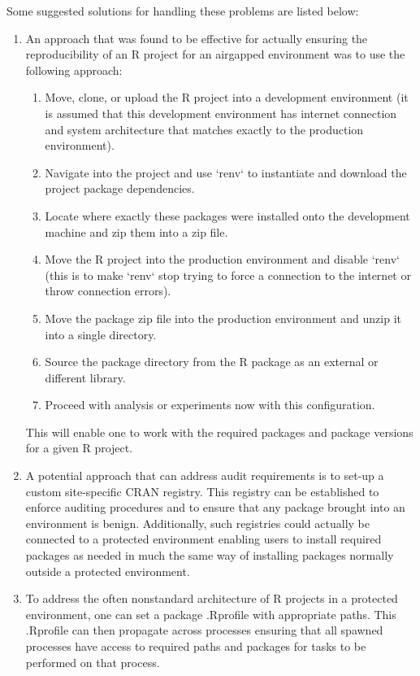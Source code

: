 \documentclass{amia}
\begin{document}
Some suggested solutions for handling these problems are listed below:

\begin{enumerate}
	\item An approach that was found to be effective for actually ensuring the reproducibility of an R project for an airgapped environment was to use the following approach:
	\begin{enumerate}
		\item Move, clone, or upload the R project into a development environment (it is assumed that this development environment has internet connection and system architecture that matches exactly to the production environment).
		\item Navigate into the project and use `renv` to instantiate and download the project package dependencies.
		\item Locate where exactly these packages were installed onto the development machine and zip them into a zip file.
		\item Move the R project into the production environment and disable `renv` (this is to make `renv` stop trying to force a connection to the internet or throw connection errors).
		\item Move the package zip file into the production environment and unzip it into a single directory.
		\item Source the package directory from the R package as an external or different library. 
		\item Proceed with analysis or experiments now with this configuration.
	\end{enumerate}
	This will enable one to work with the required packages and package versions for a given R project. 
	\item A potential approach that can address audit requirements is to set-up a custom site-specific CRAN registry. This registry can be established to enforce auditing procedures and to ensure that any package brought into an environment is benign. Additionally, such registries could actually be connected to a protected environment enabling users to install required packages as needed in much the same way of installing packages normally outside a protected environment. 
	\item To address the often nonstandard architecture of R projects in a protected environment, one can set a package .Rprofile with appropriate paths. This .Rprofile can then propagate across processes ensuring that all spawned processes have access to required paths and packages for tasks to be performed on that process.
\end{enumerate}
\end{document}
